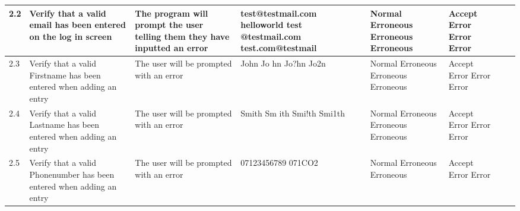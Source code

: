 \begin{landscape}
\begin{center}
\begin{longtable}{|p{1.5cm}|p{2cm}|p{2.5cm}|p{2.5cm}|p{2cm}|p{2cm}|p{2cm}|p{2cm}|}
        2.2 & Verify that a valid email has been entered on the log in screen &  The program will prompt the user telling them they have inputted an error & test@testmail.com \newline helloworld \newline test \newline @testmail.com \newline test.com@testmail & Normal \newline Erroneous \newline Erroneous \newline Erroneous & Accept \newline Error \newline Error \newline Error & & \\ \hline
        2.3 & Verify that a valid Firstname has been entered when adding an entry & The user will be prompted with an error & John \newline Jo hn \newline Jo?hn \newline Jo2n & Normal \newline Erroneous \newline Erroneous \newline Erroneous & Accept \newline Error \newline Error \newline Error & & \\ \hline
        2.4 & Verify that a valid Lastname has been entered when adding an entry & The user will be prompted with an error & Smith \newline Sm ith \newline Smi!th \newline Smi1th & Normal \newline Erroneous \newline Erroneous \newline Erroneous & Accept \newline Error \newline Error \newline Error & & \\ \hline
        2.5 & Verify that a valid Phonenumber has been entered when adding an entry & The user will be prompted with an error & 07123456789 \newline 07123123.3 \newline 071CO2 & Normal \newline Erroneous \newline Erroneous & Accept \newline Error \newline Error & & \\ \hline

\end{longtable}
\end{center}
\end{landscape}
